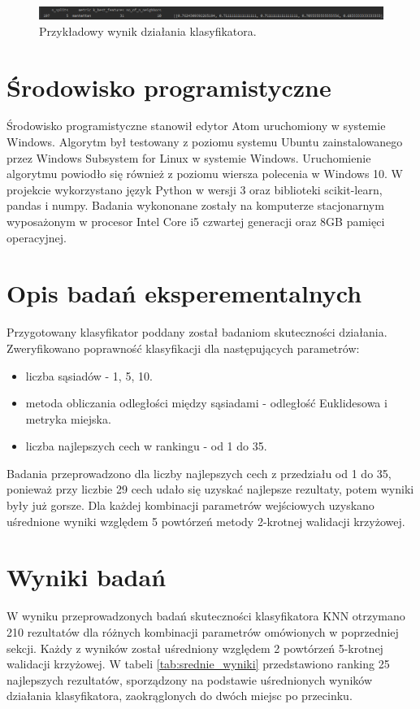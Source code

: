 \documentclass{article}
\begin{document}
\begin{figure}[h]
    \centering
    \noindent 
    \vspace{.2cm}
    \includegraphics[width=16cm]{knn_score.png}
    \caption{Przykładowy wynik działania klasyfikatora.}
    \label{fig:knn_score}
\end{figure}

\section{Środowisko programistyczne}
Środowisko programistyczne stanowił edytor Atom uruchomiony w systemie Windows. Algorytm był testowany z poziomu systemu Ubuntu zainstalowanego przez Windows Subsystem for Linux w systemie Windows. Uruchomienie algorytmu powiodło się również z poziomu wiersza polecenia w Windows 10. W projekcie wykorzystano język Python w wersji 3 oraz biblioteki scikit-learn, pandas i numpy. Badania wykononane zostały na komputerze stacjonarnym wyposażonym w procesor Intel Core i5 czwartej generacji oraz 8GB pamięci operacyjnej.

\section{Opis badań eksperementalnych}
Przygotowany klasyfikator poddany został badaniom skuteczności działania. Zweryfikowano poprawność klasyfikacji dla następujących parametrów:
\begin{itemize}
    \item liczba sąsiadów - 1, 5, 10.
    \item metoda obliczania odległości między sąsiadami - odległość Euklidesowa i metryka miejska.
    \item liczba najlepszych cech w rankingu - od 1 do 35.
\end{itemize} 

Badania przeprowadzono dla liczby najlepszych cech z przedziału od 1 do 35, ponieważ przy liczbie 29 cech udało się uzyskać najlepsze rezultaty, potem wyniki były już gorsze. Dla każdej kombinacji parametrów wejściowych uzyskano uśrednione wyniki względem 5 powtórzeń metody 2-krotnej walidacji krzyżowej.

\section{Wyniki badań}
W wyniku przeprowadzonych badań skuteczności klasyfikatora KNN otrzymano 210 rezultatów dla różnych kombinacji parametrów omówionych w poprzedniej sekcji. Każdy z wyników został uśredniony względem 2 powtórzeń 5-krotnej walidacji krzyżowej. W tabeli \ref{tab:srednie_wyniki} przedstawiono ranking 25 najlepszych rezultatów, sporządzony na podstawie uśrednionych wyników działania klasyfikatora, zaokrąglonych do dwóch miejsc po przecinku.
\end{document}
